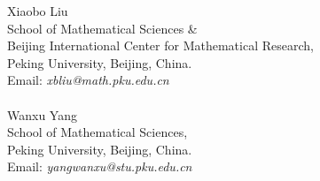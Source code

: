 \documentclass[12pt]{article}
\begin{document}
\vspace{30pt} \noindent
Xiaobo Liu \\
School of Mathematical Sciences \& \\
Beijing International Center for Mathematical Research, \\
Peking University, Beijing, China. \\
Email: {\it xbliu@math.pku.edu.cn}
\ \\ \ \\
Wanxu Yang \\
School of Mathematical Sciences, \\
Peking University, Beijing, China. \\
Email: {\it yangwanxu@stu.pku.edu.cn}
	
\end{document}
